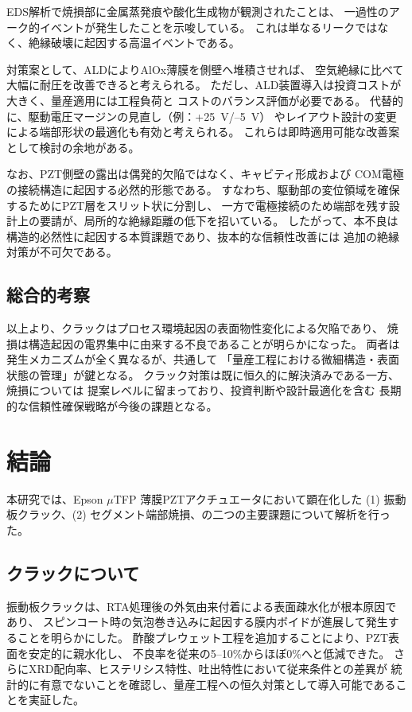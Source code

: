 \documentclass[conference]{IEEEtran}
\begin{document}
EDS解析で焼損部に金属蒸発痕や酸化生成物が観測されたことは、
一過性のアーク的イベントが発生したことを示唆している。
これは単なるリークではなく、絶縁破壊に起因する高温イベントである。

対策案として、ALDによりAlOx薄膜を側壁へ堆積させれば、
空気絶縁に比べて大幅に耐圧を改善できると考えられる。
ただし、ALD装置導入は投資コストが大きく、量産適用には工程負荷と
コストのバランス評価が必要である。
代替的に、駆動電圧マージンの見直し（例：+\SI{25}{V}/--\SI{5}{V}）
やレイアウト設計の変更による端部形状の最適化も有効と考えられる。
これらは即時適用可能な改善案として検討の余地がある。

なお、PZT側壁の露出は偶発的欠陥ではなく、キャビティ形成および
COM電極の接続構造に起因する必然的形態である。
すなわち、駆動部の変位領域を確保するためにPZT層をスリット状に分割し、
一方で電極接続のため端部を残す設計上の要請が、局所的な絶縁距離の低下を招いている。
したがって、本不良は構造的必然性に起因する本質課題であり、抜本的な信頼性改善には
追加の絶縁対策が不可欠である。

\subsection{総合的考察}
以上より、クラックはプロセス環境起因の表面物性変化による欠陥であり、
焼損は構造起因の電界集中に由来する不良であることが明らかになった。
両者は発生メカニズムが全く異なるが、共通して
「量産工程における微細構造・表面状態の管理」が鍵となる。
クラック対策は既に恒久的に解決済みである一方、焼損については
提案レベルに留まっており、投資判断や設計最適化を含む
長期的な信頼性確保戦略が今後の課題となる。

\section{結論}
本研究では、Epson $\mu$TFP 薄膜PZTアクチュエータにおいて顕在化した
(1) 振動板クラック、(2) セグメント端部焼損、の二つの主要課題について解析を行った。

\subsection{クラックについて}
振動板クラックは、RTA処理後の外気由来付着による表面疎水化が根本原因であり、
スピンコート時の気泡巻き込みに起因する膜内ボイドが進展して発生することを明らかにした。
酢酸プレウェット工程を追加することにより、PZT表面を安定的に親水化し、
不良率を従来の5--10\%からほぼ0\%へと低減できた。
さらにXRD配向率、ヒステリシス特性、吐出特性において従来条件との差異が
統計的に有意でないことを確認し、量産工程への恒久対策として導入可能であることを実証した。
\end{document}
